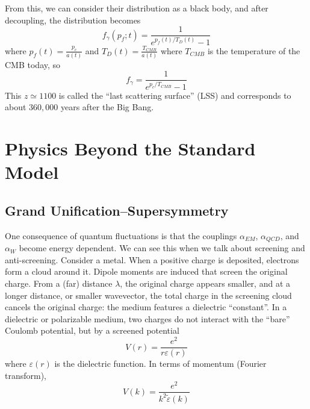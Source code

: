 \documentclass[a4paper,twoside,master.tex]{subfiles}
\begin{document}
From this, we can consider their distribution as a black body, and after decoupling, the distribution becomes
\begin{equation}
    f_{\gamma}(p_f;t) = \frac{1}{e^{p_f(t) / T_D(t)} - 1}
\end{equation}
where $ p_f(t) = \frac{p_c}{a(t)} $ and $ T_D(t) = \frac{T_{CMB}}{a(t)} $ where $ T_{CMB} $ is the temperature of the CMB today, so
\begin{equation}
    f_{\gamma} = \frac{1}{e^{p_c / T_{CMB}} - 1}
\end{equation}
This $ z \simeq 1100 $ is called the ``last scattering surface'' (LSS) and corresponds to about $ 360,000 $ years after the Big Bang.

\section{Physics Beyond the Standard Model}\label{sec:physics_beyond_the_standard_model}

\subsection{Grand Unification--Supersymmetry}\label{sub:grand_unification--supersymmetry}
One consequence of quantum fluctuations is that the couplings $ \alpha_{EM} $, $ \alpha_{QCD} $, and $ \alpha_W $ become energy dependent. We can see this when we talk about screening and anti-screening. Consider a metal. When a positive charge is deposited, electrons form a cloud around it. Dipole moments are induced that screen the original charge. From a (far) distance $ \lambda $, the original charge appears smaller, and at a longer distance, or smaller wavevector, the total charge in the screening cloud cancels the original charge: the medium features a dielectric ``constant''. In a dielectric or polarizable medium, two charges do not interact with the ``bare'' Coulomb potential, but by a screened potential
\begin{equation}
    V(r) = \frac{e^2}{r \varepsilon(r)} 
\end{equation}
where $ \varepsilon(r) $ is the dielectric function. In terms of momentum (Fourier transform),
\begin{equation}
    V(k) = \frac{e^2}{k^2 \tilde{\varepsilon}(k)}
\end{equation}
\end{document}
